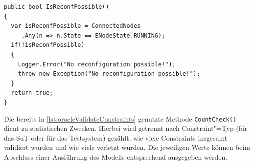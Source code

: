 \begin{lstlisting}[label=lst:oracleIsReconfPossible,style=cs,
caption={Prüfung nach der Möglichkeit weiterer Rekonfigurationen}]
public bool IsReconfPossible()
{
  var isReconfPossible = ConnectedNodes
     .Any(n => n.State == ENodeState.RUNNING);
  if(!isReconfPossible)
  {
    Logger.Error("No reconfiguration possible!");
    throw new Exception("No reconfiguration possible!");
  }
  return true;
}
\end{lstlisting}

Die bereits in \cref{lst:oracleValidateConstraints} genutzte Methode \texttt{CountCheck()} dient zu statistischen Zwecken.
Hierbei wird getrennt nach Constraint"=Typ (für das \ac{SuT} oder für das Testsystem) gezählt, wie viele Constraints insgesamt validiert wurden und wie viele verletzt wurden.
Die jeweiligen Werte können beim Abschluss einer Ausführung des Modells entsprechend ausgegeben werden.
